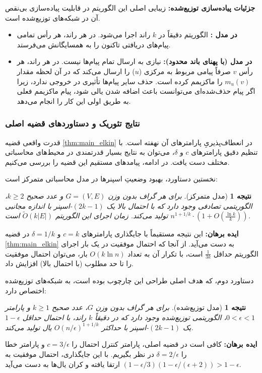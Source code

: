 \documentclass[11pt,a4paper]{report}
\theoremstyle{plain}
\newtheorem{cor}[thm]{\normalsize نتیجه}
\theoremstyle{definition}
\theoremstyle{remark}
\begin{document}
\textbf{جزئیات پیاده‌سازی توزیع‌شده:}
زیبایی اصلی این الگوریتم در قابلیت پیاده‌سازی بی‌نقص آن در شبکه‌های توزیع‌شده است.
\begin{itemize}
    \item \textbf{در مدل :} الگوریتم دقیقاً در $k$ راند اجرا می‌شود. در هر راند، هر رأس تمامی پیام‌های دریافتی تاکنون را به همسایگانش می‌فرستد.
    \item \textbf{در مدل  (با پهنای باند محدود):} نیازی به ارسال تمام پیام‌ها نیست. در هر راند، هر رأس $v$ صرفاً پیامی مربوط به مرکزی ($u$) را ارسال می‌کند که در آن لحظه مقدار $m_u(v)$ را ماکزیمم کرده است. حذف سایر پیام‌ها تأثیری در خروجی ندارد، زیرا اگر پیام حذف‌شده‌ای می‌توانست باعث اضافه شدن یالی شود، پیام ماکزیمم فعلی به طریق اولی این کار را انجام می‌دهد.
\end{itemize}

\subsubsection{نتایج تئوریک و دستاوردهای قضیه اصلی}
قدرت واقعی قضیه \ref{thm:main_elkin} در انعطاف‌پذیریِ پارامترهای آن نهفته است. با تنظیم دقیق پارامترهای $c$ و $\delta$، می‌توان به نتایج بسیار قدرتمندی در محیط‌های محاسباتی مختلف دست یافت. در ادامه، پیامدهای مستقیم این قضیه را بررسی می‌کنیم.

نخستین دستاورد، بهبود وضعیتِ اسپنرها در مدل محاسباتی متمرکز است:

\begin{cor}[مدل متمرکز]
برای هر گراف بدون وزن $G = (V,E)$ و عدد صحیح $k \ge 2$، الگوریتمی تصادفی وجود دارد که با احتمال بالا یک $(2k-1)$-اسپنر با اندازه مجانبی $n^{1+1/k} \cdot \left(1 + O(\frac{\ln k}{k})\right)$ تولید می‌کند. زمان اجرای این الگوریتم $\tilde{O}(k|E|)$ است.
\end{cor}
\textbf{ایده برهان:} این نتیجه مستقیماً با جایگذاری پارامترهای $c = k$ و $\delta = 1/k$ در قضیه \ref{thm:main_elkin} به دست می‌آید. از آنجا که احتمال موفقیت در یک بار اجرای الگوریتم حداقل $\frac{1}{3k}$ است، با تکرار آن به تعداد $O(k \ln n)$ بار، می‌توان احتمال موفقیت را تا حد مطلوب (با احتمال بالا) افزایش داد.

دستاورد دوم، که هدف اصلی طراحی این چارچوب بوده است، به شبکه‌های توزیع‌شده اختصاص دارد:

\begin{cor}[مدل توزیع‌شده]
برای هر گراف بدون وزن $G$، عدد صحیح $k \ge 1$ و پارامتر $0 < \epsilon < 1$، الگوریتمی توزیع‌شده وجود دارد که در دقیقاً $k$ راند، با احتمال حداقل $1-\epsilon$ یک $(2k-1)$-اسپنر با حداکثر $O(n/\epsilon)^{1+1/k}$ یال تولید می‌کند.
\end{cor}
\textbf{ایده برهان:} کافی است در قضیه اصلی، پارامتر کنترل احتمال را $c = 3/\epsilon$ و پارامتر خطا را $\delta = 2/\epsilon$ در نظر بگیریم. با این جایگذاری، احتمال موفقیت به $(1 - \epsilon/3)(1 - \epsilon/(\epsilon+2)) > 1 - \epsilon$ ارتقا یافته و کران یال‌ها به دست می‌آید.
\end{document}

